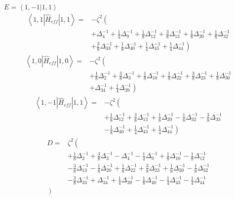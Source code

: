 \documentclass[11pt]{article}
\begin{document}
$E=\left\langle1,-1|1,1\right\rangle$\newline\newline
\begin{equation*}\begin{split}\left\langle1,1\left|\hat{H}_{eff}\right|1,1\right\rangle=&-\zeta^2\left(\right.\\
&+\Delta_{4}^{-1}+\frac{1}{4}\Delta_{9}^{-1}+\frac{1}{8}\Delta_{12}^{-1}+\frac{3}{8}\Delta_{13}^{-1}+\frac{1}{8}\Delta_{20}^{-1}+\frac{1}{8}\Delta_{32}^{-1}\\
&+\frac{3}{8}\Delta_{33}^{-1}+\frac{1}{8}\Delta_{40}^{-1}+\frac{1}{4}\Delta_{43}^{-1}+\frac{1}{4}\Delta_{44}^{-1}\left.\right)\end{split}\end{equation*}\newline
\begin{equation*}\begin{split}\left\langle1,0\left|\hat{H}_{eff}\right|1,0\right\rangle=&-\zeta^2\left(\right.\\
&+\frac{1}{8}\Delta_{2}^{-1}+\frac{3}{8}\Delta_{3}^{-1}+\frac{1}{8}\Delta_{10}^{-1}+\frac{1}{8}\Delta_{22}^{-1}+\frac{3}{8}\Delta_{23}^{-1}+\frac{1}{8}\Delta_{30}^{-1}\\
&+\Delta_{34}^{-1}+\frac{1}{4}\Delta_{39}^{-1}\left.\right)\end{split}\end{equation*}\newline
\begin{equation*}\begin{split}\left\langle1,-1\left|\hat{H}_{eff}\right|1,1\right\rangle=&-\zeta^2\left(\right.\\
&+\frac{1}{8}\Delta_{12}^{-1}+\frac{3}{8}\Delta_{13}^{-1}+\frac{1}{8}\Delta_{20}^{-1}-\frac{1}{8}\Delta_{32}^{-1}-\frac{3}{8}\Delta_{33}^{-1}\\
&-\frac{1}{8}\Delta_{40}^{-1}+\frac{1}{4}\Delta_{43}^{-1}+\frac{1}{4}\Delta_{44}^{-1}\left.\right)\end{split}\end{equation*}\newline
\begin{equation*}\begin{split}D=&\zeta^2\left(\right.\\
&+\frac{1}{8}\Delta_{2}^{-1}+\frac{3}{8}\Delta_{3}^{-1}-\Delta_{4}^{-1}-\frac{1}{4}\Delta_{9}^{-1}+\frac{1}{8}\Delta_{10}^{-1}-\frac{1}{8}\Delta_{12}^{-1}\\
&-\frac{3}{8}\Delta_{13}^{-1}-\frac{1}{8}\Delta_{20}^{-1}+\frac{1}{8}\Delta_{22}^{-1}+\frac{3}{8}\Delta_{23}^{-1}+\frac{1}{8}\Delta_{30}^{-1}-\frac{1}{8}\Delta_{32}^{-1}\\
&-\frac{3}{8}\Delta_{33}^{-1}+\Delta_{34}^{-1}+\frac{1}{4}\Delta_{39}^{-1}-\frac{1}{8}\Delta_{40}^{-1}-\frac{1}{4}\Delta_{43}^{-1}-\frac{1}{4}\Delta_{44}^{-1}\\
\left.\right)\end{split}\end{equation*}\newline
\end{document}
